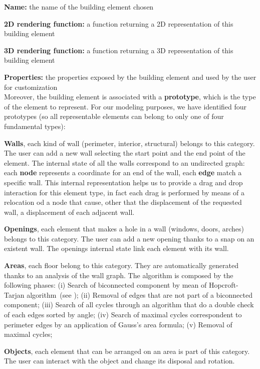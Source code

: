 \textbf{Name:} the name of the building element chosen

\textbf{2D rendering function:} a function returning a 2D representation of this building element

\textbf{3D rendering function:} a function returning a 3D representation of this building element

\textbf{Properties:} the properties exposed by the building element and used by the user for customization\\

Moreover, the building element is associated with a \textbf{prototype}, which is the type of the element to represent. For our modeling purposes, we have identified four prototypes (so all representable elements can belong to only one of four fundamental types):

\textbf{Walls}, each kind of wall (perimeter, interior, structural) belongs to this category. The user can add a new wall selecting the start point and the end point of the element. The internal state of all the walls correspond to an undirected graph: each \textbf{node} represents a coordinate for an end of the wall, each \textbf{edge} match a specific wall. This internal representation helps us to provide a drag and drop interaction for this element type, in fact each drag is performed by means of a relocation od a node that cause, other that the displacement of the requested wall, a displacement of each adjacent wall.

\textbf{Openings}, each element that makes a hole in a wall (windows, doors, arches) belongs to this category. The user can add a new opening thanks to a snap on an existent wall. The openings internal state link each element with its wall.

\textbf{Areas}, each floor belong to this category. They are automatically generated thanks to an analysis of the wall graph. The algorithm is composed by the following phases: (i) Search of biconnected component by mean of Hopcroft-Tarjan algorithm~(see \cite{Hopcroft:1973:AEA:362248.362272}); (ii) Removal of edges that are not part of a biconnected component; (iii) Search of all cycles through an algorithm that do a double check of each edges sorted by angle; (iv) Search of maximal cycles correspondent to perimeter edges by an application of Gauss's area formula; (v) Removal of maximal cycles;

\textbf{Objects}, each element that can be arranged on an area is part of this category. The user can interact with the object and change its disposal and rotation.